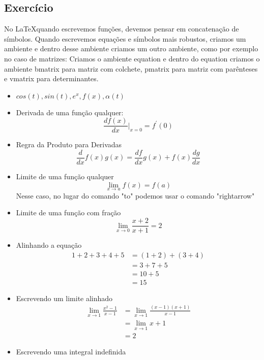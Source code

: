 \documentclass[12pt,a4paper]{article}
\begin{document}
\subsection{Exercício}
No \LaTeX quando escrevemos funções, devemos pensar em concatenação de símbolos. Quando escrevemos equações e símbolos mais robustos, criamos um ambiente e dentro desse ambiente criamos um outro ambiente, como por exemplo no caso de matrizes: Criamos o ambiente equation e dentro do equation criamos o ambiente bmatrix para matriz com colchete, pmatrix para matriz com parênteses e vmatrix para determinantes.
\begin{itemize}
    \item $cos(t),sin(t),e^{x},f(x),\alpha(t)$
    \item Derivada de uma função qualquer:$$\dfrac{df(x)}{dx} \Big|_{x=0} = f^{'}(0)$$
    \item Regra da Produto para Derivadas
    \begin{equation}
        \dfrac{d}{dx}f(x)g(x) = \dfrac{df}{dx}g(x) + f(x)\dfrac{dg}{dx}
    \end{equation}
    \item Limite de uma função qualquer
    \begin{equation}
        \lim_{x\to a}f(x) = f(a)
    \end{equation}
    Nesse caso, no lugar do comando "to"  podemos usar o comando "rightarrow"
    \item Limite de uma função com fração
    \begin{equation}
        \lim_{x \to 0}\frac{x + 2}{x + 1}= 2
    \end{equation}
    \item Alinhando a equação
    \begin{align}
        1 + 2 + 3 + 4 + 5 &= 
        (1 + 2) + (3 + 4) \\
        &= 3 + 7 + 5 \\
        &= 10 + 5\\
        &= 15
    \end{align}
    \item Escrevendo um limite alinhado 
    \begin{align}
        \lim_{x \to 1}\frac{x^{2} - 1}{x-1} &= \lim_{x \to 1}\frac{(x-1)(x+1)}{x-1} \\
        &= \lim_{x \to 1}x+1 \\
        &= 2
    \end{align}
    \item Escrevendo uma integral indefinida

\end{itemize}
\end{document}
